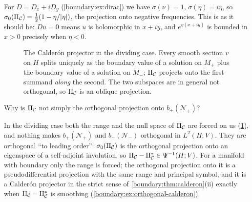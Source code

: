 \begin{example}
For $D=D_x+iD_y$ (\cref{boundary:ex:dirac}) we have $\sigma(\nu)=1$, $\sigma(\eta)=
i\eta$, so $\sigma_0(\Pi_{\mathcal{C}})=\frac12(1-\eta/|\eta|)$, the projection onto negative
frequencies. This is as it should be: $Du=0$ means $u$ is holomorphic in $x+iy$, and
$e^{\eta(x+iy)}$ is bounded in $x>0$ precisely when $\eta<0$.
\end{example}

\begin{figure}[ht]
  \centering
  \caption{The Calder\'on projector in the dividing case. Every smooth section $v$ on
  $H$ splits uniquely as the boundary value of a solution on $M_+$ plus the boundary
  value of a solution on $M_-$; $\Pi_{\mathcal{C}}$ projects onto the first summand \emph{along}
  the second. The two subspaces are in general not orthogonal, so $\Pi_{\mathcal{C}}$ is an
  oblique projection.}
  \label{boundary:fig:calderon}
\end{figure}

\begin{question}
Why is $\Pi_{\mathcal{C}}$ not simply the orthogonal projection onto $b_+(\mathcal N_+)$?
\end{question}
\begin{answer}
In the dividing case both the range and the null space of $\Pi_{\mathcal{C}}$ are forced on us
(\cref{boundary:fig:calderon}), and nothing makes $b_+(\mathcal N_+)$ and
$b_-(\mathcal N_-)$ orthogonal in $L^2(H;V)$. They are orthogonal ``to leading
order'': $\sigma_0(\Pi_{\mathcal{C}})$ is the orthogonal projection onto an eigenspace of a
self-adjoint involution, so $\Pi_{\mathcal{C}}-\Pi_{\mathcal{C}}^*\in\Psi^{-1}(H;V)$. For a manifold with
boundary only the range is forced; the orthogonal projection onto it is a
pseudodifferential projection with the same range and principal symbol, and it is a
Calder\'on projector in the strict sense of \cref{boundary:thm:calderon}(ii) exactly when
$\Pi_{\mathcal{C}}-\Pi_{\mathcal{C}}^*$ is smoothing (\cref{boundary:ex:orthogonal-calderon}).
\end{answer}

